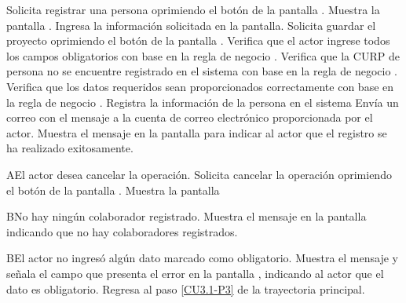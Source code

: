 	\begin{UCtrayectoria}
		\UCpaso[\UCactor] Solicita registrar una persona oprimiendo el botón  de la pantalla .
		\UCpaso[\UCsist] Muestra la pantalla .
		\UCpaso[\UCactor] Ingresa la información solicitada en la pantalla. \label{CU3.1-P3}
		\UCpaso[\UCactor] Solicita guardar el proyecto oprimiendo el botón  de la pantalla . 
		\UCpaso[\UCsist] Verifica que el actor ingrese todos los campos obligatorios con base en la regla de negocio . 
		\UCpaso[\UCsist] Verifica que la CURP de persona no se encuentre registrado en el sistema con base en la regla de negocio . 
		\UCpaso[\UCsist] Verifica que los datos requeridos sean proporcionados correctamente con base en la regla de negocio .  
		\UCpaso[\UCsist] Registra la información de la persona en el sistema
		\UCpaso[\UCsist] Envía un correo con el mensaje  a la cuenta de correo electrónico proporcionada por el actor.
		\UCpaso[\UCsist] Muestra el mensaje  en la pantalla  para indicar al actor que el registro se ha realizado exitosamente.
	\end{UCtrayectoria}		
		\begin{UCtrayectoriaA}{A}{El actor desea cancelar la operación.}
			\UCpaso[\UCactor] Solicita cancelar la operación oprimiendo el botón  de la pantalla .
			\UCpaso[\UCsist] Muestra la pantalla 
		\end{UCtrayectoriaA}


		\begin{UCtrayectoriaA}{B}{No hay ningún colaborador registrado.}
	\UCpaso[\UCsist] Muestra el mensaje  en la pantalla  indicando que no hay colaboradores registrados.
		\end{UCtrayectoriaA}

	\begin{UCtrayectoriaA}{B}{El actor no ingresó algún dato marcado como obligatorio.}
		\UCpaso[\UCsist] Muestra el mensaje  y señala el campo que presenta el error en la pantalla , indicando al actor que el dato es obligatorio.
		\UCpaso Regresa al paso \ref{CU3.1-P3} de la trayectoria principal.
	\end{UCtrayectoriaA}
	
